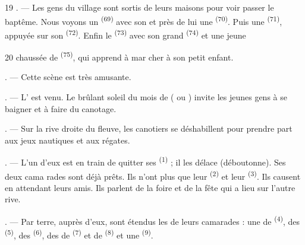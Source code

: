 \begin{VUpage}[21]{19}
. --- Les gens du village sont sortis de leurs\nl
maisons pour voir passer le baptême. Nous voyons\nl
un  \textsuperscript{(69)} avec son  et près\nl
de lui une  \textsuperscript{(70)}. Puis une  \textsuperscript{(71)},\nl
appuyée sur son  \textsuperscript{(72)}. Enfin le  \textsuperscript{(73)}\nl
avec son grand  \textsuperscript{(74)} et une jeune
\parplein
\end{VUpage}

\begin{VUpage}[22]{20}
\VUcontinue
{} chaussée de  \textsuperscript{(75)}, qui apprend à mar\cc
cher à son petit enfant.

. --- Cette scène est très amusante.

\VUsaut{4.0mm}
\VUsaut{3.0mm}

\VUsaut{3.0mm}

. --- L' est venu. Le brûlant soleil du mois de\nl
{} ( ou ) invite les jeunes gens à se\nl
baigner et à faire du canotage.

. --- Sur la rive droite du fleuve, les canotiers se\nl
déshabillent pour prendre part aux jeux nautiques et\nl
aux régates.

. --- L'un d'eux est en train de quitter ses \cc
{} \textsuperscript{(1)} ; il les délace (déboutonne). Ses deux cama\cc
rades sont déjà prêts. Ils n'ont plus que leur  \textsuperscript{(2)}\nl
et leur  \textsuperscript{(3)}. Ils causent en attendant leurs\nl
amis. Ils parlent de la foire et de la fête qui a lieu\nl
sur l'autre rive.

. --- Par terre, auprès d'eux, sont étendus les\nl
{} de leurs camarades : une  de \cc
{} \textsuperscript{(4)}, des  \textsuperscript{(5)}, des  \textsuperscript{(6)}, des\nl
{} de  \textsuperscript{(7)} et de  \textsuperscript{(8)} et une \cc
{} \textsuperscript{(9)}.


\end{VUpage}
